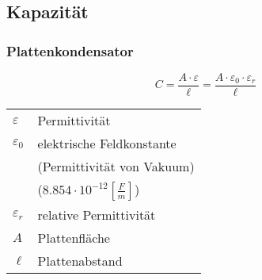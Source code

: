 



\subsection{Kapazität}
\subsubsection{Plattenkondensator}
\[ C = \frac{A \cdot \varepsilon}{\ell} 
= \frac{A \cdot \varepsilon_0 \cdot \varepsilon_r}{\ell} \]
\begin{tabular}{lp{}}
$\varepsilon$&Permittivität\\
$\varepsilon_0$&elektrische Feldkonstante\\
&(Permittivität von Vakuum)\\
&($8.854 \cdot 10^{-12} \left[\frac{F}{m}\right]$)\\
$\varepsilon_r$&relative Permittivität\\
$A$&Plattenfläche\\
$\ell$&Plattenabstand
\end{tabular}